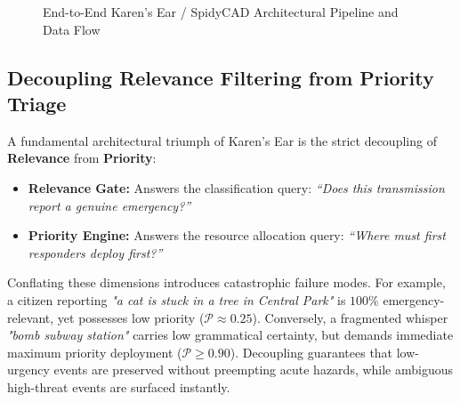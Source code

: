 \documentclass[10pt,a4paper]{article}
\begin{document}
\begin{figure}[htbp]
  \vspace{-0.1cm}
  \caption{End-to-End Karen's Ear / SpidyCAD Architectural Pipeline and Data Flow}
  \label{fig:architecture_pipeline}
\end{figure}

\subsection{Decoupling Relevance Filtering from Priority Triage}
A fundamental architectural triumph of Karen's Ear is the strict decoupling of \textbf{Relevance} from \textbf{Priority}:
\begin{itemize}
  \item \textbf{Relevance Gate:} Answers the classification query: \emph{``Does this transmission report a genuine emergency?''}
  \item \textbf{Priority Engine:} Answers the resource allocation query: \emph{``Where must first responders deploy first?''}
\end{itemize}
Conflating these dimensions introduces catastrophic failure modes. For example, a citizen reporting \emph{"a cat is stuck in a tree in Central Park"} is $100\%$ emergency-relevant, yet possesses low priority ($\mathcal{P} \approx 0.25$). Conversely, a fragmented whisper \emph{"bomb subway station"} carries low grammatical certainty, but demands immediate maximum priority deployment ($\mathcal{P} \ge 0.90$). Decoupling guarantees that low-urgency events are preserved without preempting acute hazards, while ambiguous high-threat events are surfaced instantly.
\end{document}
